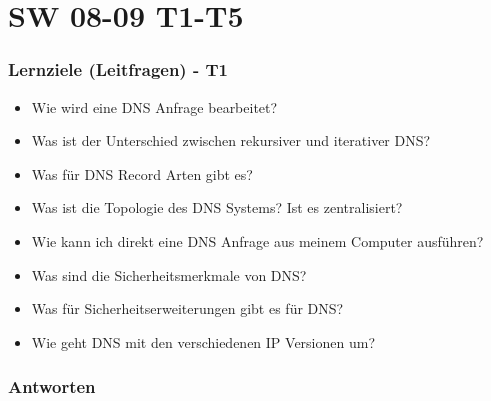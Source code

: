 \part{SW 08-09 T1-T5}
\section{Lernziele (Leitfragen) - T1}
\begin{itemize}
    \item Wie wird eine DNS Anfrage bearbeitet?
    \item Was ist der Unterschied zwischen rekursiver und iterativer DNS?
    \item Was für DNS Record Arten gibt es?
    \item Was ist die Topologie des DNS Systems? Ist es zentralisiert?
    \item Wie kann ich direkt eine DNS Anfrage aus meinem Computer ausführen?
    \item Was sind die Sicherheitsmerkmale von DNS?
    \item Was für Sicherheitserweiterungen gibt es für DNS?
    \item Wie geht DNS mit den verschiedenen IP Versionen um?
\end{itemize}

\section{Antworten}

